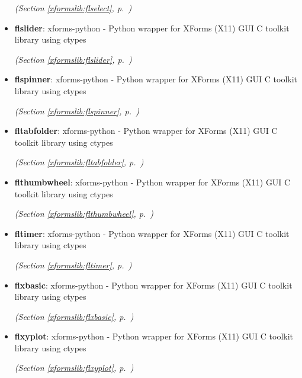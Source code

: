 \begin{itemize}
  \textit{(Section \ref{xformslib:flselect}, p.~\pageref{xformslib:flselect})}

\item \textbf{flslider}: 
xforms-python - Python wrapper for XForms (X11) GUI C toolkit library
using ctypes




  \textit{(Section \ref{xformslib:flslider}, p.~\pageref{xformslib:flslider})}

\item \textbf{flspinner}: 
xforms-python - Python wrapper for XForms (X11) GUI C toolkit library
using ctypes




  \textit{(Section \ref{xformslib:flspinner}, p.~\pageref{xformslib:flspinner})}

\item \textbf{fltabfolder}: 
xforms-python - Python wrapper for XForms (X11) GUI C toolkit library
using ctypes




  \textit{(Section \ref{xformslib:fltabfolder}, p.~\pageref{xformslib:fltabfolder})}

\item \textbf{flthumbwheel}: 
xforms-python - Python wrapper for XForms (X11) GUI C toolkit library
using ctypes




  \textit{(Section \ref{xformslib:flthumbwheel}, p.~\pageref{xformslib:flthumbwheel})}

\item \textbf{fltimer}: 
xforms-python - Python wrapper for XForms (X11) GUI C toolkit library
using ctypes




  \textit{(Section \ref{xformslib:fltimer}, p.~\pageref{xformslib:fltimer})}

\item \textbf{flxbasic}: 
xforms-python - Python wrapper for XForms (X11) GUI C toolkit library
using ctypes




  \textit{(Section \ref{xformslib:flxbasic}, p.~\pageref{xformslib:flxbasic})}

\item \textbf{flxyplot}: 
xforms-python - Python wrapper for XForms (X11) GUI C toolkit library
using ctypes




  \textit{(Section \ref{xformslib:flxyplot}, p.~\pageref{xformslib:flxyplot})}


\end{itemize}
